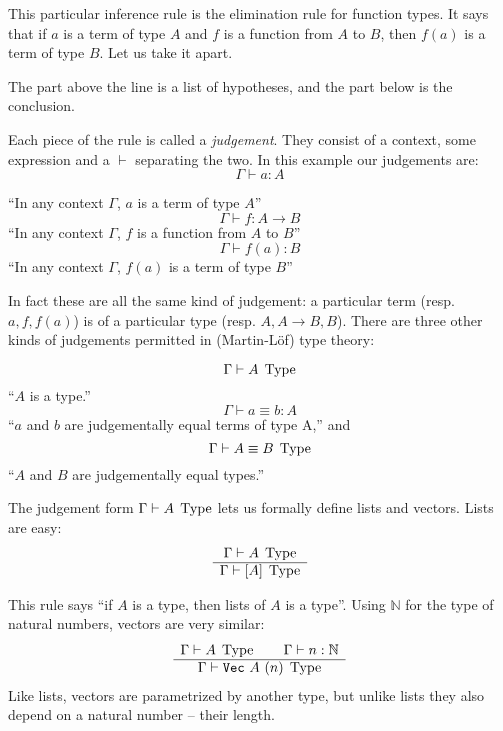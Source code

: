 This particular inference rule is the elimination rule for function types. It
says that if $a$ is a term of type $A$ and $f$ is a function from $A$ to $B$,
then $f(a)$ is a term of type $B$. Let us take it apart.

The part above the line is a list of hypotheses, and the part below is the conclusion.

Each piece of the rule is called a \emph{judgement}. They consist of a
context, some expression and a $\vdash$ separating the two. In this example our judgements are:
\[\Gamma \vdash a : A\]
\begin{center}
``In any context $\Gamma$, $a$ is a term of type $A$''
\[\Gamma \vdash f : A \rightarrow B\]
``In any context $\Gamma$, $f$ is a function from $A$ to $B$''
\[\Gamma \vdash f(a) : B\]
``In any context $\Gamma$, $f(a)$ is a term of type $B$''
\end{center}

In fact these are all the same kind of judgement: a particular term (resp. $a, f,
f(a)$) is of a particular type (resp. $A, A \rightarrow B, B$). There are three
other kinds of judgements permitted in (Martin-Löf) type theory:
\begin{center}
  \[\Gamma \vdash A \; \operatorname{Type}\]
  ``$A$ is a type.''
  \[\Gamma \vdash a \equiv b : A\]
  ``$a$ and $b$ are judgementally equal terms of type A,'' and
  \[\Gamma \vdash A \equiv B \; \operatorname{Type}\]
  ``$A$ and $B$ are judgementally equal types.''
\end{center}

The judgement form $\Gamma \vdash A \; \operatorname{Type}$ lets us formally define lists and
vectors. Lists are easy:
\begin{equation*}
  \begin{array}{c}
    \Gamma \vdash A \; \operatorname{Type} \\
    \hline
    \Gamma \vdash [A] \; \operatorname{Type}
  \end{array}
  \label{rule:lists}
\end{equation*}

This rule says ``if $A$ is a type, then lists of $A$ is a type''. Using
$\mathbb{N}$ for the type of natural numbers, vectors are very similar:
\begin{equation*}
  \begin{array}{c}
    \Gamma \vdash A \; \operatorname{Type} \qquad \Gamma \vdash n : \mathbb{N} \\
    \hline
    \Gamma \vdash \texttt{Vec}~A~(n) \; \operatorname{Type}
  \end{array}
  \label{rule:vectors}
\end{equation*}
Like lists, vectors are parametrized by another type, but unlike lists they also
depend on a natural number -- their length.

